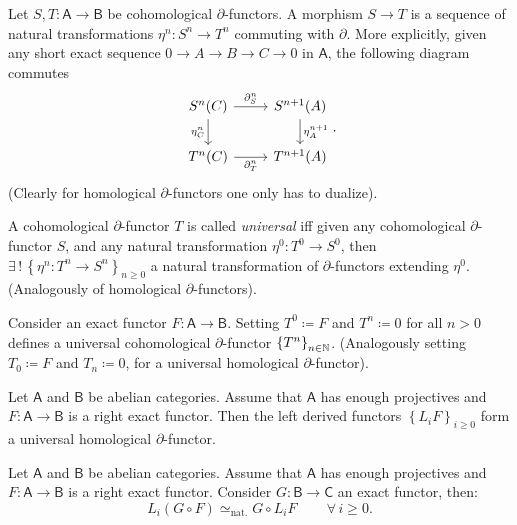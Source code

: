 \begin{defn}
	Let $S,T\colon\mathsf{A} \to \mathsf{B}$ be cohomological $\partial$-functors.
	A morphism $S \to T$ is a sequence of natural transformations
	$\eta^n\colon S^n \to T^n$ commuting with $\partial$.
	More explicitly, given any short exact sequence $0 \to A \to B \to C \to 0$ in $\mathsf{A}$,
	the following diagram commutes
	\begin{equation}
	\begin{tikzcd}
		S^n(C) \arrow[r, "\partial^n_S", rightarrow] \arrow[d, "\eta^n_C"', rightarrow] &
		S^{n+1}(A) \arrow[d, "\eta^{n+1}_A", rightarrow] \\
		T^n(C) \arrow[r, "\partial^n_T"', rightarrow] &
		T^{n+1}(A)
	\end{tikzcd}
	.\end{equation} 
	(Clearly for homological $\partial$-functors one only has to dualize).
\end{defn}

\begin{defn}
	A cohomological $\partial$-functor $T$ is called {\em universal} iff
	given any cohomological $\partial$-functor $S$, and any natural
	transformation $\eta^0\colon T^0 \to S^0$, then
	$\exists\, !\, \left\{ \eta^n\colon T^n \to S^n \right\}_{n \geq 0}$ a natural transformation
	of $\partial$-functors extending $\eta^0$.
	(Analogously of homological $\partial$-functors).
\end{defn}

\begin{lem}
	Consider an exact functor $F\colon\mathsf{A} \to \mathsf{B}$.
	Setting $T^0 \coloneqq F$ and $T^n \coloneqq 0$ for all $n > 0$
	defines a universal cohomological $\partial$-functor $\left\{ T^n \right\}_{n \in \mathbb{N}}$.
	(Analogously setting $T_0 \coloneqq F$ and $T_n \coloneqq 0$, for a universal homological
	$\partial$-functor).
\end{lem}  

\begin{thm}[]
	Let $\mathsf{A}$ and $\mathsf{B}$ be abelian categories.
	Assume that $\mathsf{A}$ has enough projectives and $F\colon\mathsf{A} \to \mathsf{B}$
	is a right exact functor.
	Then the left derived functors $\left\{ L_i F \right\}_{i \geq 0}$
	form a universal homological $\partial$-functor.
\end{thm}

\begin{lem}
	Let $\mathsf{A}$ and $\mathsf{B}$ be abelian categories.
	Assume that $\mathsf{A}$ has enough projectives and $F\colon\mathsf{A} \to \mathsf{B}$
	is a right exact functor.
	Consider $G\colon\mathsf{B} \to \mathsf{C}$ an exact functor, then:
	\begin{equation}
		L_i \left( G \circ F \right) \simeq_{\text{nat.}} G \circ L_i F
		\qquad \,\forall\, i \geq 0
	.\end{equation} 
\end{lem} 

